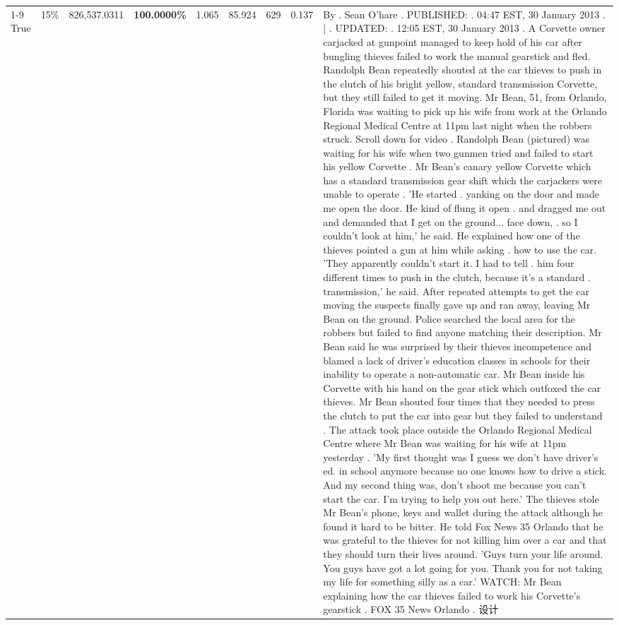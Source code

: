 \begin{table}[H]
\begin{tabular}{lllrlllll}
\cline{1-9} \cline{2-9}
True & 15\% & 826,537.0311 & \bfseries \color{red} 100.0000\% & 1.065 & 85.924 & 629 & 0.137 & By . Sean O'hare . PUBLISHED: . 04:47 EST, 30 January 2013 . | . UPDATED: . 12:05 EST, 30 January 2013 . A Corvette owner carjacked at gunpoint managed to keep hold of his car after bungling thieves failed to work the manual gearstick and fled. Randolph Bean repeatedly shouted at the car thieves to push in the clutch of his bright yellow, standard transmission Corvette, but they still failed to get it moving. Mr Bean, 51, from Orlando, Florida was waiting to pick up his wife from work at the Orlando Regional Medical Centre at 11pm last night when the robbers struck. Scroll down for video . Randolph Bean (pictured) was waiting for his wife when two gunmen tried and failed to start his yellow Corvette . Mr Bean's canary yellow Corvette which has a standard transmission gear shift which the carjackers were unable to operate . 'He started . yanking on the door and made me open the door. He kind of flung it open . and dragged me out and demanded that I get on the ground... face down, . so I couldn't look at him,' he said. He explained how one of the thieves pointed a gun at him while asking . how to use the car. 'They apparently couldn't start it. I had to tell . him four different times to push in the clutch, because it's a standard . transmission,' he said. After repeated attempts to get the car moving the suspects finally gave up and ran away, leaving Mr Bean on the ground. Police searched the local area for the robbers but failed to find anyone matching their description. Mr Bean said he was surprised by their thieves incompetence and blamed a lack of driver's education classes in schools for their inability to operate a non-automatic car. Mr Bean inside his Corvette with his hand on the gear stick which outfoxed the car thieves. Mr Bean shouted four times that they needed to press the clutch to put the car into gear but they failed to understand . The attack took place outside the Orlando Regional Medical Centre where Mr Bean was waiting for his wife at 11pm yesterday . 'My first thought was I guess we don't have driver's ed. in school anymore because no one knows how to drive a stick. And my second thing was, don't shoot me because you can't start the car. I'm trying to help you out here.' The thieves stole Mr Bean's phone, keys and wallet during the attack although he found it hard to be bitter. He told Fox News 35 Orlando that he was grateful to the thieves for not killing him over a car and that they should turn their lives around. 'Guys turn your life around. You guys have got a lot going for you. Thank you for not taking my life for something silly as a car.' WATCH: Mr Bean explaining how the car thieves failed to work his Corvette's gearstick . FOX 35 News Orlando . 设计 \\

\end{tabular}
\end{table}
